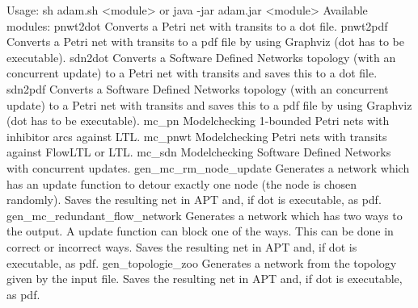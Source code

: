 Usage: sh adam.sh <module> or java -jar adam.jar <module>
Available modules:
  pnwt2dot                       Converts a Petri net with transits to a
                                 dot file.
  pnwt2pdf                       Converts a Petri net with transits to a
                                 pdf file by using Graphviz (dot has to be
                                 executable).
  sdn2dot                        Converts a Software Defined Networks
                                 topology (with an concurrent update) to a
                                 Petri net with transits and saves this to
                                 a dot file.
  sdn2pdf                        Converts a Software Defined Networks
                                 topology (with an concurrent update) to a
                                 Petri net with transits and saves this to
                                 a pdf file by using Graphviz (dot has to
                                 be executable).
  mc_pn                          Modelchecking 1-bounded Petri nets with
                                 inhibitor arcs against LTL.
  mc_pnwt                        Modelchecking Petri nets with transits
                                 against FlowLTL  or LTL.
  mc_sdn                         Modelchecking Software Defined Networks
                                 with concurrent updates.
  gen_mc_rm_node_update          Generates a network which has an update
                                 function to detour exactly one node (the
                                 node is chosen randomly). Saves the
                                 resulting net in APT and, if dot is
                                 executable, as pdf.
  gen_mc_redundant_flow_network  Generates a network which has two ways to
                                 the output. A update function can block
                                 one of the ways. This can be done in
                                 correct or incorrect ways. Saves the
                                 resulting net in APT and, if dot is
                                 executable, as pdf.
  gen_topologie_zoo              Generates a network from the topology
                                 given by the input file. Saves the
                                 resulting net in APT and, if dot is
                                 executable, as pdf.
